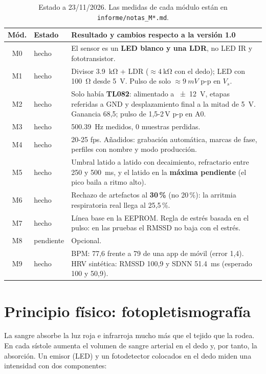 \documentclass[11pt,a4paper]{article}
\begin{document}
\begin{table}[H]
\centering\small
\caption{Estado a 23/11/2026. Las medidas de cada módulo están en
\texttt{informe/notas\_M*.md}.}
\label{tab:estado_trabajo}
\begin{tabularx}{\textwidth}{clX}
\toprule
Mód. & Estado & Resultado y cambios respecto a la versión 1.0 \\
\midrule
M0 & hecho & El sensor es un \textbf{LED blanco y una LDR}, no LED IR y fototransistor. \\
M1 & hecho & Divisor \qty{3.9}{\kilo\ohm} + LDR ($\approx \qty{4}{\kilo\ohm}$ con el dedo); LED con \qty{100}{\ohm} desde \qty{5}{V}. Pulso de solo $\approx\qty{9}{mV}$ p-p en $V_s$. \\
M2 & hecho & Solo había \textbf{TL082}: alimentado a \qty{\pm 12}{V}, etapas referidas a GND y desplazamiento final a la mitad de \qty{5}{V}. Ganancia 68,5; pulso de 1,5-2\,V p-p en A0. \\
M3 & hecho & \qty{500.39}{Hz} medidos, 0 muestras perdidas. \\
M4 & hecho & 20-25 fps. Añadidos: grabación automática, marcas de fase, perfiles con nombre y modo producción. \\
M5 & hecho & Umbral latido a latido con decaimiento, refractario entre 250 y \qty{500}{ms}, y el latido en la \textbf{máxima pendiente} (el pico baila a ritmo alto). \\
M6 & hecho & Rechazo de artefactos al \textbf{30\,\%} (no 20\,\%): la arritmia respiratoria real llega al 25,5\,\%. \\
M7 & hecho & Línea base en la EEPROM. Regla de estrés basada en el pulso: en las pruebas el RMSSD no baja con el estrés. \\
M8 & pendiente & Opcional. \\
M9 & hecho & BPM: 77,6 frente a 79 de una app de móvil (error 1,4). HRV sintética: RMSSD 100,9 y SDNN \qty{51.4}{ms} (esperado 100 y 50,9). \\
\bottomrule
\end{tabularx}
\end{table}

\section{Principio físico: fotopletismografía}

La sangre absorbe la luz roja e infrarroja mucho más que el tejido que la rodea. En cada
sístole aumenta el volumen de sangre arterial en el dedo y, por tanto, la absorción. Un
emisor (LED) y un fotodetector colocados en el dedo miden una intensidad con dos componentes:
\end{document}
